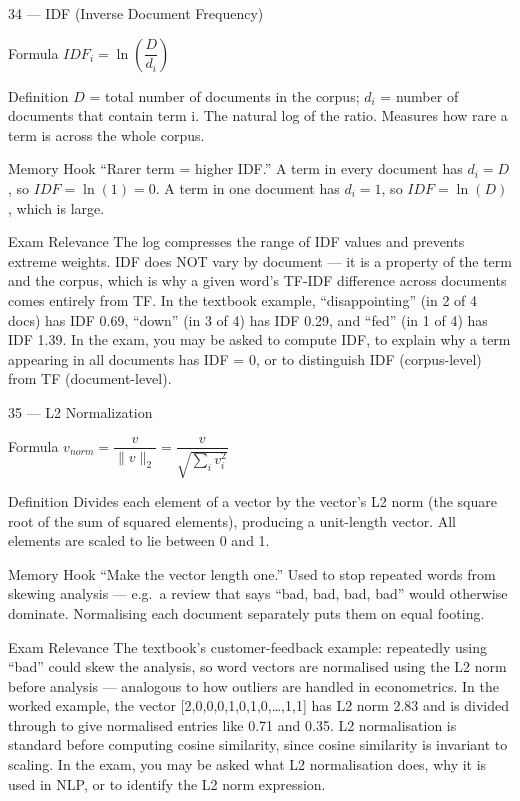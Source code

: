 \documentclass[aspectratio=169,8pt]{beamer}
\begin{document}
	\begin{frame}{34 --- IDF (Inverse Document Frequency)}
		\begin{block}{Formula}
			$IDF_i = \ln\!\left(\dfrac{D}{d_i}\right)$
		\end{block}
		\begin{block}{Definition}
			$D$ = total number of documents in the corpus; $d_i$ = number of documents that contain term i. The natural log of the ratio. Measures how rare a term is across the whole corpus.
		\end{block}
		\begin{block}{Memory Hook}
			``Rarer term = higher IDF.'' A term in every document has $d_i = D$, so $IDF = \ln(1) = 0$. A term in one document has $d_i = 1$, so $IDF = \ln(D)$, which is large.
		\end{block}
		\begin{block}{Exam Relevance}
			The log compresses the range of IDF values and prevents extreme weights. IDF does NOT vary by document --- it is a property of the term and the corpus, which is why a given word's TF-IDF difference across documents comes entirely from TF. In the textbook example, ``disappointing'' (in 2 of 4 docs) has IDF 0.69, ``down'' (in 3 of 4) has IDF 0.29, and ``fed'' (in 1 of 4) has IDF 1.39. In the exam, you may be asked to compute IDF, to explain why a term appearing in all documents has IDF = 0, or to distinguish IDF (corpus-level) from TF (document-level).
		\end{block}
	\end{frame}
	
	\begin{frame}{35 --- L2 Normalization}
		\begin{block}{Formula}
			$v_{norm} = \dfrac{v}{\|v\|_2} = \dfrac{v}{\sqrt{\sum_i v_i^2}}$
		\end{block}
		\begin{block}{Definition}
			Divides each element of a vector by the vector's L2 norm (the square root of the sum of squared elements), producing a unit-length vector. All elements are scaled to lie between 0 and 1.
		\end{block}
		\begin{block}{Memory Hook}
			``Make the vector length one.'' Used to stop repeated words from skewing analysis --- e.g.\ a review that says ``bad, bad, bad, bad'' would otherwise dominate. Normalising each document separately puts them on equal footing.
		\end{block}
		\begin{block}{Exam Relevance}
			The textbook's customer-feedback example: repeatedly using ``bad'' could skew the analysis, so word vectors are normalised using the L2 norm before analysis --- analogous to how outliers are handled in econometrics. In the worked example, the vector [2,0,0,0,1,0,1,0,\dots,1,1] has L2 norm 2.83 and is divided through to give normalised entries like 0.71 and 0.35. L2 normalisation is standard before computing cosine similarity, since cosine similarity is invariant to scaling. In the exam, you may be asked what L2 normalisation does, why it is used in NLP, or to identify the L2 norm expression.
		\end{block}
	\end{frame}
	
\end{document}
